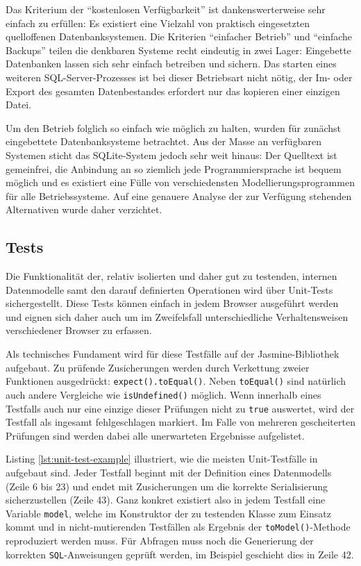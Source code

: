 Das Kriterium der ``kostenlosen Verfügbarkeit'' ist dankenswerterweise sehr einfach zu erfüllen: Es existiert eine Vielzahl von praktisch eingesetzten quelloffenen Datenbanksystemen. Die Kriterien ``einfacher Betrieb'' und ``einfache Backups'' teilen die denkbaren Systeme recht eindeutig in zwei Lager: Eingebette Datenbanken lassen sich sehr einfach betreiben und sichern. Das starten eines weiteren SQL-Server-Prozesses ist bei dieser Betriebsart nicht nötig, der Im- oder Export des gesamten Datenbestandes erfordert nur das kopieren einer einzigen Datei.

Um den Betrieb folglich so einfach wie möglich zu halten, wurden für \idename{} zunächst eingebettete Datenbanksysteme betrachtet. Aus der Masse an verfügbaren Systemen sticht das SQLite-System jedoch sehr weit hinaus: Der Quelltext ist gemeinfrei, die Anbindung an so ziemlich jede Programmiersprache ist bequem möglich und es existiert eine Fülle von verschiedensten Modellierungsprogrammen für alle Betriebssysteme. Auf eine genauere Analyse der zur Verfügung stehenden Alternativen wurde daher verzichtet.

\subsection{Tests}

Die Funktionalität der, relativ isolierten und daher gut zu testenden, internen Datenmodelle samt den darauf definierten Operationen wird über Unit-Tests sichergestellt. Diese Tests können einfach in jedem Browser ausgeführt werden und eignen sich daher auch um im Zweifelsfall unterschiedliche Verhaltensweisen verschiedener Browser zu erfassen.

Als technisches Fundament wird für diese Testfälle auf der Jasmine-Bibliothek aufgebaut. Zu prüfende Zusicherungen werden durch Verkettung zweier Funktionen ausgedrückt: \texttt{expect().toEqual()}. Neben \texttt{toEqual()} sind natürlich auch andere Vergleiche wie \texttt{isUndefined()} möglich. Wenn innerhalb eines Testfalls auch nur eine einzige dieser Prüfungen nicht zu \texttt{true} auswertet, wird der Testfall als ingesamt fehlgeschlagen markiert. Im Falle von mehreren gescheiterten Prüfungen sind werden dabei alle unerwarteten Ergebnisse aufgelistet.

Listing \ref{lst:unit-test-example} illustriert, wie die meisten Unit-Testfälle in \idename{} aufgebaut sind. Jeder Testfall beginnt mit der Definition eines Datenmodells (Zeile 6 bis 23) und endet mit Zusicherungen um die korrekte Serialisierung sicherzustellen (Zeile 43). Ganz konkret existiert also in jedem Testfall eine Variable \texttt{model}, welche im Konstruktor der zu testenden Klasse zum Einsatz kommt und in nicht-mutierenden Testfällen als Ergebnis der \texttt{toModel()}-Methode reproduziert werden muss. Für Abfragen muss noch die Generierung der korrekten \texttt{SQL}-Anweisungen geprüft werden, im Beispiel geschieht dies in Zeile 42.

